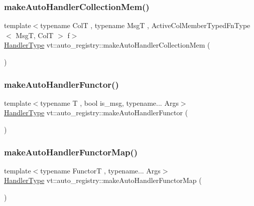 \subsubsection{\texorpdfstring{make\+Auto\+Handler\+Collection\+Mem()}{makeAutoHandlerCollectionMem()}}
{\footnotesize\ttfamily template$<$typename ColT , typename MsgT , Active\+Col\+Member\+Typed\+Fn\+Type$<$ Msg\+T, Col\+T $>$ f$>$ \\
\hyperlink{namespacevt_af64846b57dfcaf104da3ef6967917573}{Handler\+Type} vt\+::auto\+\_\+registry\+::make\+Auto\+Handler\+Collection\+Mem (\begin{DoxyParamCaption}{ }\end{DoxyParamCaption})\hspace{0.3cm}{\ttfamily [inline]}}

\mbox{\label{namespacevt_1_1auto__registry_a473fb7ec675cc28fde0d6b0c5b19ac19}} 
\subsubsection{\texorpdfstring{make\+Auto\+Handler\+Functor()}{makeAutoHandlerFunctor()}}
{\footnotesize\ttfamily template$<$typename T , bool is\+\_\+msg, typename... Args$>$ \\
\hyperlink{namespacevt_af64846b57dfcaf104da3ef6967917573}{Handler\+Type} vt\+::auto\+\_\+registry\+::make\+Auto\+Handler\+Functor (\begin{DoxyParamCaption}{ }\end{DoxyParamCaption})\hspace{0.3cm}{\ttfamily [inline]}}

\mbox{\label{namespacevt_1_1auto__registry_a64989cf40ed8fc5266f9eb67607f4842}} 
\subsubsection{\texorpdfstring{make\+Auto\+Handler\+Functor\+Map()}{makeAutoHandlerFunctorMap()}}
{\footnotesize\ttfamily template$<$typename FunctorT , typename... Args$>$ \\
\hyperlink{namespacevt_af64846b57dfcaf104da3ef6967917573}{Handler\+Type} vt\+::auto\+\_\+registry\+::make\+Auto\+Handler\+Functor\+Map (\begin{DoxyParamCaption}{ }\end{DoxyParamCaption})\hspace{0.3cm}{\ttfamily [inline]}}


